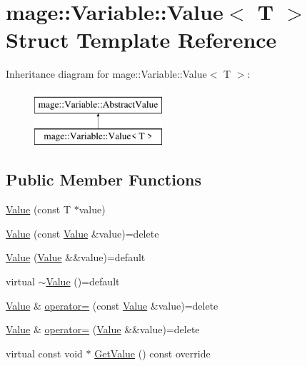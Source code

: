\hypertarget{structmage_1_1_variable_1_1_value}{}\section{mage\+:\+:Variable\+:\+:Value$<$ T $>$ Struct Template Reference}
\label{structmage_1_1_variable_1_1_value}
Inheritance diagram for mage\+:\+:Variable\+:\+:Value$<$ T $>$\+:\begin{figure}[H]
\begin{center}
\leavevmode
\includegraphics[height=2.000000cm]{structmage_1_1_variable_1_1_value}
\end{center}
\end{figure}
\subsection*{Public Member Functions}
\begin{DoxyCompactItemize}
\item 
\hyperlink{structmage_1_1_variable_1_1_value_a1e29cc5eaeb8356a11a1eca0232cf162}{Value} (const T $\ast$value)
\item 
\hyperlink{structmage_1_1_variable_1_1_value_a89ed544e50981c1714f21a31f499b041}{Value} (const \hyperlink{structmage_1_1_variable_1_1_value}{Value} \&value)=delete
\item 
\hyperlink{structmage_1_1_variable_1_1_value_aeadb858e9a40f211c787cacc2fb2843b}{Value} (\hyperlink{structmage_1_1_variable_1_1_value}{Value} \&\&value)=default
\item 
virtual \hyperlink{structmage_1_1_variable_1_1_value_ab77eb80d4786a060778dc41ee73c1371}{$\sim$\+Value} ()=default
\item 
\hyperlink{structmage_1_1_variable_1_1_value}{Value} \& \hyperlink{structmage_1_1_variable_1_1_value_a19c45282edac9ffaa0f687b7dd414392}{operator=} (const \hyperlink{structmage_1_1_variable_1_1_value}{Value} \&value)=delete
\item 
\hyperlink{structmage_1_1_variable_1_1_value}{Value} \& \hyperlink{structmage_1_1_variable_1_1_value_a2185d5eeb8f321a7e4f6d97463af4987}{operator=} (\hyperlink{structmage_1_1_variable_1_1_value}{Value} \&\&value)=delete
\item 
virtual const void $\ast$ \hyperlink{structmage_1_1_variable_1_1_value_a04d70496ebb7ad71dafa3df877daeb26}{Get\+Value} () const override
\end{DoxyCompactItemize}
